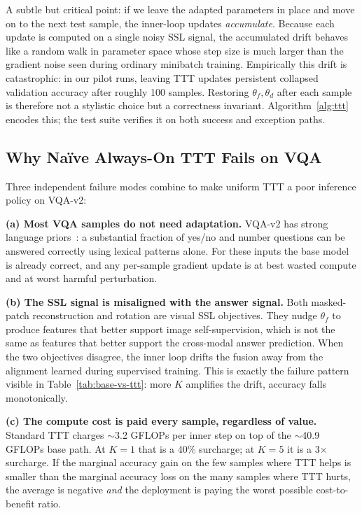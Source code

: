 \documentclass[conference]{IEEEtran}
\begin{document}
A subtle but critical point: if we leave the adapted parameters in place
and move on to the next test sample, the inner-loop updates
\emph{accumulate}. Because each update is computed on a single noisy
SSL signal, the accumulated drift behaves like a random walk in
parameter space whose step size is much larger than the gradient noise
seen during ordinary minibatch training. Empirically this drift is
catastrophic: in our pilot runs, leaving TTT updates persistent collapsed
validation accuracy after roughly 100 samples. Restoring $\theta_f,
\theta_d$ after each sample is therefore not a stylistic choice but a
correctness invariant. Algorithm~\ref{alg:ttt} encodes this; the test
suite verifies it on both success and exception paths.

\subsection{Why Naïve Always-On TTT Fails on VQA}
\label{sec:ttt-fails}

Three independent failure modes combine to make uniform TTT a poor
inference policy on VQA-v2:

\textbf{(a) Most VQA samples do not need adaptation.} VQA-v2 has strong
language priors~\cite{b1}: a substantial fraction of yes/no and number
questions can be answered correctly using lexical patterns alone. For
these inputs the base model is already correct, and any per-sample
gradient update is at best wasted compute and at worst harmful
perturbation.

\textbf{(b) The SSL signal is misaligned with the answer signal.} Both
masked-patch reconstruction and rotation are visual SSL objectives. They
nudge $\theta_f$ to produce features that better support image
self-supervision, which is not the same as features that better support
the cross-modal answer prediction. When the two objectives disagree,
the inner loop drifts the fusion away from the alignment learned during
supervised training. This is exactly the failure pattern visible in
Table~\ref{tab:base-vs-ttt}: more $K$ amplifies the drift, accuracy
falls monotonically.

\textbf{(c) The compute cost is paid every sample, regardless of value.}
Standard TTT charges $\sim$3.2 GFLOPs per inner step on top of the
$\sim$40.9 GFLOPs base path. At $K{=}1$ that is a 40\% surcharge; at
$K{=}5$ it is a 3$\times$ surcharge. If the marginal accuracy gain on
the few samples where TTT helps is smaller than the marginal accuracy
loss on the many samples where TTT hurts, the average is negative
\emph{and} the deployment is paying the worst possible cost-to-benefit
ratio.
\end{document}
